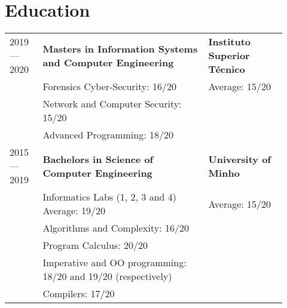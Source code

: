 \documentclass{article}
\begin{document}
\section{Education}

\begin{tabular}{p{0.11\linewidth}p{0.55\linewidth}p{0.26\linewidth}}

    2019 --- 2020 &
        \textbf{Masters in Information Systems and Computer Engineering}
    &
        \textbf{Instituto Superior Técnico}
    \\
    & Forensics Cyber-Security: 16/20 & Average: 15/20 \\
    & Network and Computer Security: 15/20 &\\
    & Advanced Programming: 18/20 &\\

    2015 --- 2019
    &
        \textbf{Bachelors in Science of Computer Engineering}
    &
        \textbf{University of Minho}
    \\
    & Informatics Labs (1, 2, 3 and 4) Average: 19/20 & Average: 15/20 \\
    & Algorithms and Complexity: 16/20 & \\
    & Program Calculus: 20/20 & \\
    & Imperative and OO programming: 18/20 and 19/20 (respectively) &\\
    & Compilers: 17/20 &\\

\end{tabular}


\end{document}
